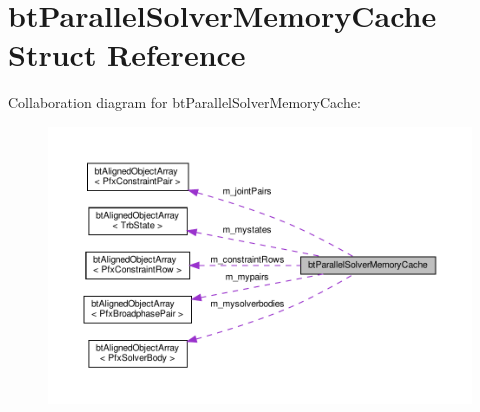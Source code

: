 \hypertarget{structbtParallelSolverMemoryCache}{}\section{bt\+Parallel\+Solver\+Memory\+Cache Struct Reference}
\label{structbtParallelSolverMemoryCache}


Collaboration diagram for bt\+Parallel\+Solver\+Memory\+Cache\+:
\nopagebreak
\begin{figure}[H]
\begin{center}
\leavevmode
\includegraphics[width=350pt]{structbtParallelSolverMemoryCache__coll__graph}
\end{center}
\end{figure}
